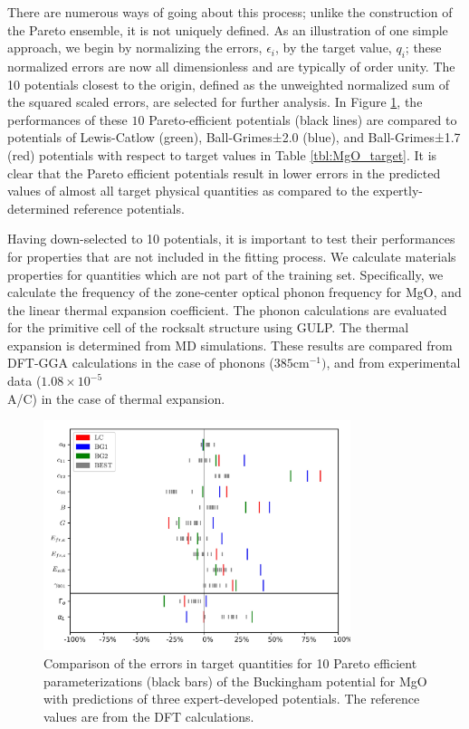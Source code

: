 	There are numerous ways of going about this process; unlike the construction of the Pareto ensemble, it is not uniquely defined.  As an illustration of one simple approach, we begin by normalizing the errors, $\epsilon_i$, by the target value, $q_i$; these normalized errors are now all dimensionless and are typically of order unity.  The 10 potentials closest to the origin, defined as the unweighted normalized sum of the squared scaled errors, are selected for further analysis.  In Figure \ref{fig:MgO_qoi_rugplots}, the performances of these $10$ Pareto-efficient potentials (black lines) are compared to potentials of Lewis-Catlow (green), Ball-Grimes±2.0 (blue), and Ball-Grimes±1.7 (red) potentials with respect to target values in Table \ref{tbl:MgO_target}. It is clear that the Pareto efficient potentials result in lower errors in the predicted values of almost all target physical quantities as compared to the expertly-determined reference potentials.

Having down-selected to 10 potentials, it is important to test their performances for properties that are not included in the fitting process. We calculate materials properties for quantities which are not part of the training set.  Specifically, we calculate the frequency of the zone-center optical phonon frequency for MgO, and the linear thermal expansion coefficient.  The phonon calculations are evaluated for the primitive cell of the rocksalt structure using GULP\cite{gale2003_gulp}.  The thermal expansion is determined from MD simulations. These results are compared from DFT-GGA calculations in the case of phonons ($385 \text{cm}^{-1})$, and from experimental data ($1.08\times10^{-5}$ \\A/\degree C) \cite{ho1998_thermal_expansion} in the case of thermal expansion.

\begin{figure}[ht]
	\centering
  \includegraphics[width=0.8\textwidth]{chapter7/MgO_qoi_rugplots}
  \caption{Comparison of the errors in target quantities for 10 Pareto efficient parameterizations (black bars) of the Buckingham potential for MgO with predictions of three expert-developed potentials. The reference values are from the DFT calculations.}
  \label{fig:MgO_qoi_rugplots}
\end{figure}


